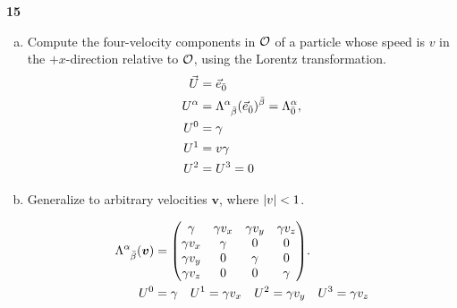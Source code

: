 \documentclass[gr-notes.tex]{subfiles}
\begin{document}
\textbf{15}

\begin{enumerate}[(a)]
\item Compute the four-velocity components in $\mathcal{O}$ of a particle whose speed is $v$ in the $+x$-direction relative to $\mathcal{O}$, using the Lorentz transformation.
%
\begin{align*}
  \vec{U} &= \vec{e}_{\bar0}
  \\
  \tensor{U}{^\alpha} &=
  \tensor{\Lambda}{^\alpha_{\bar\beta}} (\vec{e}_{\bar0})^{\bar\beta} =
  \Lambda^\alpha_{\bar0},
  \\
  U^0 &= \gamma
  \\
  U^1 &= v \gamma
  \\
  U^2 &= U^3 = 0
\end{align*}

\item Generalize to arbitrary velocities $\boldsymbol{v}$, where $\abs{v} < 1$.

\begin{align*}
  \tensor{\Lambda}{^\alpha_{\bar\beta}}(\boldsymbol{v}) &=
  \mqty(\gamma     & \gamma v_x & \gamma v_y & \gamma v_z \\
        \gamma v_x & \gamma     & 0          & 0          \\
        \gamma v_y & 0          & \gamma     & 0          \\
        \gamma v_z & 0          & 0          & \gamma     ).
  \\
  U^0 &= \gamma
  \quad
  U^1 = \gamma v_x
  \quad
  U^2 = \gamma v_y
  \quad
  U^3 = \gamma v_z
\end{align*}




\end{enumerate}
\end{document}
